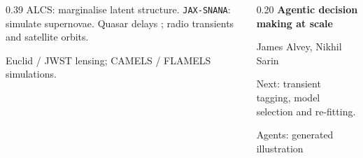 \documentclass[aspectratio=169]{beamer}
\begin{document}
\begin{frame}[t]
\begin{columns}[T,onlytextwidth]
\begin{column}{0.39\textwidth}
            \smallskip
            ALCS: marginalise latent structure. 
            \texttt{JAX-SNANA}: simulate supernovae. 
            Quasar delays ; radio transients and satellite orbits.\par
            \smallskip
            Euclid / JWST lensing; CAMELS / FLAMELS simulations.
        \end{column}
        \begin{column}{0.20\textwidth}
            \footnotesize
            \textbf{Agentic decision making at scale}\par
            {\scriptsize James Alvey, Nikhil Sarin\par}
            \smallskip
            Next: transient tagging, model selection and re-fitting.\par
            \smallskip
            {\tiny Agents: generated illustration\par}
        \end{column}
    \end{columns}
\end{frame}
\end{document}
